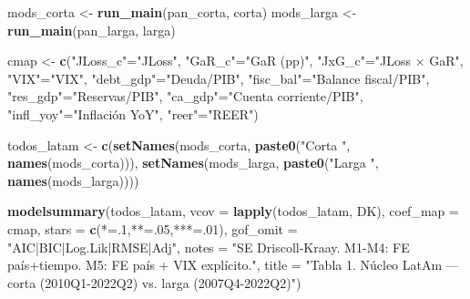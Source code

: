 \documentclass[
]{article}
\newenvironment{Shaded}{\begin{snugshade}}{\end{snugshade}}
\newcommand{\AttributeTok}[1]{\textcolor[rgb]{0.13,0.29,0.53}{#1}}
\newcommand{\DecValTok}[1]{\textcolor[rgb]{0.00,0.00,0.81}{#1}}
\newcommand{\FunctionTok}[1]{\textcolor[rgb]{0.13,0.29,0.53}{\textbf{#1}}}
\newcommand{\NormalTok}[1]{#1}
\newcommand{\OtherTok}[1]{\textcolor[rgb]{0.56,0.35,0.01}{#1}}
\newcommand{\StringTok}[1]{\textcolor[rgb]{0.31,0.60,0.02}{#1}}
\begin{document}
\begin{Shaded}
\begin{Highlighting}[]
\NormalTok{mods\_corta }\OtherTok{\textless{}{-}} \FunctionTok{run\_main}\NormalTok{(pan\_corta, corta)}
\NormalTok{mods\_larga }\OtherTok{\textless{}{-}} \FunctionTok{run\_main}\NormalTok{(pan\_larga, larga)}

\NormalTok{cmap }\OtherTok{\textless{}{-}} \FunctionTok{c}\NormalTok{(}\StringTok{"JLoss\_c"}\OtherTok{=}\StringTok{"JLoss"}\NormalTok{, }\StringTok{"GaR\_c"}\OtherTok{=}\StringTok{"GaR (pp)"}\NormalTok{, }\StringTok{"JxG\_c"}\OtherTok{=}\StringTok{"JLoss × GaR"}\NormalTok{, }\StringTok{"VIX"}\OtherTok{=}\StringTok{"VIX"}\NormalTok{,}
          \StringTok{"debt\_gdp"}\OtherTok{=}\StringTok{"Deuda/PIB"}\NormalTok{, }\StringTok{"fisc\_bal"}\OtherTok{=}\StringTok{"Balance fiscal/PIB"}\NormalTok{,}
          \StringTok{"res\_gdp"}\OtherTok{=}\StringTok{"Reservas/PIB"}\NormalTok{, }\StringTok{"ca\_gdp"}\OtherTok{=}\StringTok{"Cuenta corriente/PIB"}\NormalTok{,}
          \StringTok{"infl\_yoy"}\OtherTok{=}\StringTok{"Inflación YoY"}\NormalTok{, }\StringTok{"reer"}\OtherTok{=}\StringTok{"REER"}\NormalTok{)}

\NormalTok{todos\_latam }\OtherTok{\textless{}{-}} \FunctionTok{c}\NormalTok{(}\FunctionTok{setNames}\NormalTok{(mods\_corta, }\FunctionTok{paste0}\NormalTok{(}\StringTok{"Corta "}\NormalTok{, }\FunctionTok{names}\NormalTok{(mods\_corta))),}
                  \FunctionTok{setNames}\NormalTok{(mods\_larga, }\FunctionTok{paste0}\NormalTok{(}\StringTok{"Larga "}\NormalTok{, }\FunctionTok{names}\NormalTok{(mods\_larga))))}

\FunctionTok{modelsummary}\NormalTok{(todos\_latam,}
  \AttributeTok{vcov =} \FunctionTok{lapply}\NormalTok{(todos\_latam, DK),}
  \AttributeTok{coef\_map =}\NormalTok{ cmap,}
  \AttributeTok{stars =} \FunctionTok{c}\NormalTok{(}\StringTok{\textquotesingle{}*\textquotesingle{}}\OtherTok{=}\NormalTok{.}\DecValTok{1}\NormalTok{,}\StringTok{\textquotesingle{}**\textquotesingle{}}\OtherTok{=}\NormalTok{.}\DecValTok{05}\NormalTok{,}\StringTok{\textquotesingle{}***\textquotesingle{}}\OtherTok{=}\NormalTok{.}\DecValTok{01}\NormalTok{),}
  \AttributeTok{gof\_omit =} \StringTok{"AIC|BIC|Log.Lik|RMSE|Adj"}\NormalTok{,}
  \AttributeTok{notes =} \StringTok{"SE Driscoll{-}Kraay. M1{-}M4: FE país+tiempo. M5: FE país + VIX explícito."}\NormalTok{,}
  \AttributeTok{title =} \StringTok{"Tabla 1. Núcleo LatAm — corta (2010Q1{-}2022Q2) vs. larga (2007Q4{-}2022Q2)"}\NormalTok{)}
\end{Highlighting}
\end{Shaded}
\end{document}
